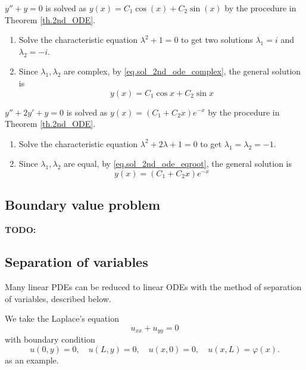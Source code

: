 \begin{example}[]
    $y'' + y = 0$ is solved as $y(x)=C_1\cos(x)+C_2\sin(x)$ by the procedure in Theorem \ref{th.2nd_ODE}.
    \begin{enumerate}
        \item Solve the characteristic equation $\lambda^2 + 1 = 0$ to get two solutions $\lambda_1 = i$ and $\lambda_2 = -i$.
        \item Since $\lambda_1,\lambda_2$ are complex, by \eqref{eq.sol_2nd_ode_complex}, the general solution is 
        \begin{equation}
            y(x)=C_1 \cos x + C_2 \sin x
        \end{equation}
    \end{enumerate}
\end{example}

\begin{example}[]
    $y'' + 2y' + y = 0$ is solved as $y(x)=(C_1+C_2x)e^{-x}$ by the procedure in Theorem \ref{th.2nd_ODE}.
    \begin{enumerate}
        \item Solve the characteristic equation $\lambda^2 + 2\lambda + 1 = 0$ to get $\lambda_1 = \lambda_2 = -1$.
        \item Since $\lambda_1,\lambda_2$ are equal, by \eqref{eq.sol_2nd_ode_eqroot}, the general solution is 
        \begin{equation}
            y(x)=(C_1+C_2x)e^{-x}
        \end{equation}
    \end{enumerate}
\end{example}

\subsection{Boundary value problem}
\textbf{TODO: }

\subsection{Separation of variables}
Many linear PDEs can be reduced to linear ODEs with the method of separation of
variables, described below.

We take the Laplace's equation
\begin{equation}\label{eq.Laplace}
    u_{x x}+u_{y y}=0
\end{equation}
with boundary condition
\begin{equation}\label{eq.Laplace_boundary}
    u(0, y)=0, \quad u(L, y)=0, \quad u(x, 0)=0, \quad u(x, L)=\varphi(x).
\end{equation}
as an example.

